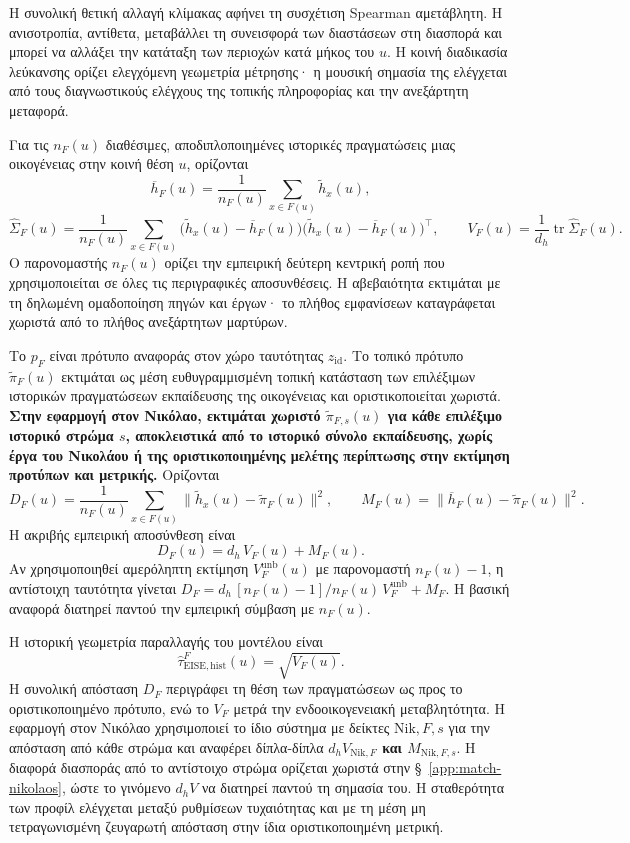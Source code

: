 \documentclass[11pt,a4paper]{article}
\begin{document}
Η συνολική θετική αλλαγή κλίμακας αφήνει τη συσχέτιση Spearman αμετάβλητη. Η ανισοτροπία, αντίθετα, μεταβάλλει τη συνεισφορά των διαστάσεων στη διασπορά και μπορεί να αλλάξει την κατάταξη των περιοχών κατά μήκος του $u$. Η κοινή διαδικασία λεύκανσης ορίζει ελεγχόμενη γεωμετρία μέτρησης· η μουσική σημασία της ελέγχεται από τους διαγνωστικούς ελέγχους της τοπικής πληροφορίας και την ανεξάρτητη μεταφορά.

Για τις $n_F(u)$ διαθέσιμες, αποδιπλοποιημένες ιστορικές πραγματώσεις μιας οικογένειας στην κοινή θέση $u$, ορίζονται
\[
\overline h_F(u)=\frac{1}{n_F(u)}\sum_{x\in F(u)}\widetilde h_x(u),
\]
\[
\widehat\Sigma_F(u)=\frac{1}{n_F(u)}
\sum_{x\in F(u)}
\bigl(\widetilde h_x(u)-\overline h_F(u)\bigr)
\bigl(\widetilde h_x(u)-\overline h_F(u)\bigr)^\top,
\qquad
V_F(u)=\frac{1}{d_h}\operatorname{tr}\widehat\Sigma_F(u).
\]
Ο παρονομαστής $n_F(u)$ ορίζει την εμπειρική δεύτερη κεντρική ροπή που χρησιμοποιείται σε όλες τις περιγραφικές αποσυνθέσεις. Η αβεβαιότητα εκτιμάται με τη δηλωμένη ομαδοποίηση πηγών και έργων· το πλήθος εμφανίσεων καταγράφεται χωριστά από το πλήθος ανεξάρτητων μαρτύρων.

Το $p_F$ είναι πρότυπο αναφοράς στον χώρο ταυτότητας $z_{\mathrm{id}}$. Το τοπικό πρότυπο $\widetilde\pi_F(u)$ εκτιμάται ως μέση ευθυγραμμισμένη τοπική κατάσταση των επιλέξιμων ιστορικών πραγματώσεων εκπαίδευσης της οικογένειας και οριστικοποιείται χωριστά. \textbf{Στην εφαρμογή στον Νικόλαο, εκτιμάται χωριστό $\widetilde\pi_{F,s}(u)$ για κάθε επιλέξιμο ιστορικό στρώμα $s$, αποκλειστικά από το ιστορικό σύνολο εκπαίδευσης, χωρίς έργα του Νικολάου ή της οριστικοποιημένης μελέτης περίπτωσης στην εκτίμηση προτύπων και μετρικής.} Ορίζονται
\[
D_F(u)=\frac{1}{n_F(u)}\sum_{x\in F(u)}
\|\widetilde h_x(u)-\widetilde\pi_F(u)\|^2,
\qquad
M_F(u)=\|\overline h_F(u)-\widetilde\pi_F(u)\|^2.
\]
Η ακριβής εμπειρική αποσύνθεση είναι
\[
\boxed{D_F(u)=d_h\,V_F(u)+M_F(u).}
\]
Αν χρησιμοποιηθεί αμερόληπτη εκτίμηση $V_F^{\mathrm{unb}}(u)$ με παρονομαστή $n_F(u)-1$, η αντίστοιχη ταυτότητα γίνεται $D_F=d_h\,[n_F(u)-1]/n_F(u)\,V_F^{\mathrm{unb}}+M_F$. Η βασική αναφορά διατηρεί παντού την εμπειρική σύμβαση με $n_F(u)$.

Η ιστορική γεωμετρία παραλλαγής του μοντέλου είναι
\[
\widehat\tau_{\mathrm{EISE,hist}}^F(u)=\sqrt{V_F(u)}.
\]
Η συνολική απόσταση $D_F$ περιγράφει τη θέση των πραγματώσεων ως προς το οριστικοποιημένο πρότυπο, ενώ το $V_F$ μετρά την ενδοοικογενειακή μεταβλητότητα. Η εφαρμογή στον Νικόλαο χρησιμοποιεί το ίδιο σύστημα με δείκτες $\mathrm{Nik},F,s$ για την απόσταση από κάθε στρώμα και αναφέρει δίπλα-δίπλα \textbf{$d_hV_{\mathrm{Nik},F}$ και $M_{\mathrm{Nik},F,s}$}. Η διαφορά διασποράς από το αντίστοιχο στρώμα ορίζεται χωριστά στην §~\ref{app:match-nikolaos}, ώστε το γινόμενο $d_hV$ να διατηρεί παντού τη σημασία του. Η σταθερότητα των προφίλ ελέγχεται μεταξύ ρυθμίσεων τυχαιότητας και με τη μέση μη τετραγωνισμένη ζευγαρωτή απόσταση στην ίδια οριστικοποιημένη μετρική.
\end{document}
